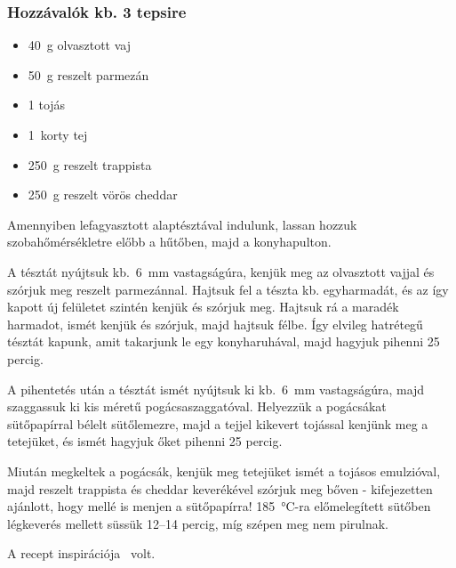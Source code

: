 \subsubsection*{Hozzávalók kb. 3 tepsire}
\begin{itemize}
    \item \qty{40}{\g} olvasztott vaj
    \item \qty{50}{\g} reszelt parmezán
    \item \num{1} tojás
    \item \qty{1}{korty} tej
    \item \qty{250}{\g} reszelt trappista
    \item \qty{250}{\g} reszelt vörös cheddar
\end{itemize}

Amennyiben lefagyasztott alaptésztával indulunk, lassan hozzuk szobahőmérsékletre előbb a hűtőben, majd a konyhapulton.

A tésztát nyújtsuk kb.~\qty{6}{\mm} vastagságúra, kenjük meg az olvasztott vajjal és szórjuk meg reszelt parmezánnal. Hajtsuk fel a tészta kb. egyharmadát, és az így kapott új felületet szintén kenjük és szórjuk meg. Hajtsuk rá a maradék harmadot, ismét kenjük és szórjuk, majd hajtsuk félbe. Így elvileg hatrétegű tésztát kapunk, amit takarjunk le egy konyharuhával, majd hagyjuk pihenni \num{25} percig.

A pihentetés után a tésztát ismét nyújtsuk ki kb.~\qty{6}{\mm} vastagságúra, majd szaggassuk ki kis méretű pogácsaszaggatóval. Helyezzük a pogácsákat sütőpapírral bélelt sütőlemezre, majd a tejjel kikevert tojással kenjünk meg a tetejüket, és ismét hagyjuk őket pihenni \num{25} percig.

Miután megkeltek a pogácsák, kenjük meg tetejüket ismét a tojásos emulzióval, majd reszelt trappista és cheddar keverékével szórjuk meg bőven - kifejezetten ajánlott, hogy mellé is menjen a sütőpapírra! \qty{185}{\celsius}-ra előmelegített sütőben légkeverés mellett süssük \numrange{12}{14} percig, míg szépen meg nem pirulnak.

A recept inspirációja~\cite{szabi_pogi} volt.
